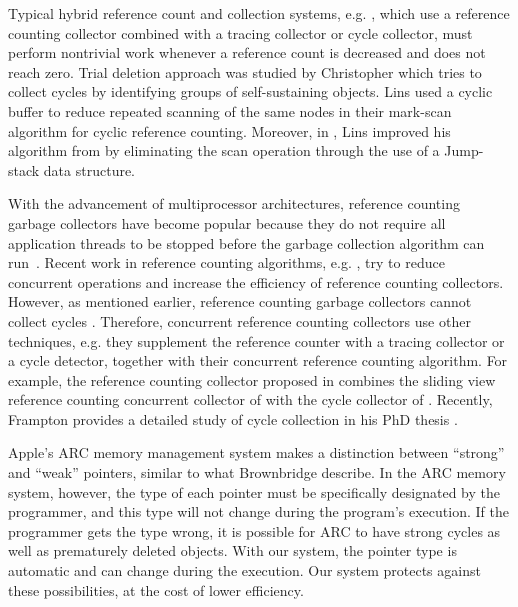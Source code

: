 Typical hybrid reference count and collection systems, e.g. \cite{Bacon2001,Levanoni2006,Bacon:2001:JWC,Barabash2005,Lins2008}, which use a reference counting collector combined with a tracing collector or cycle collector,
must perform nontrivial work whenever a reference count is decreased and does
not reach zero. Trial deletion approach was studied by Christopher \cite{Christopher1984} which tries to collect cycles by identifying groups of self-sustaining objects. 
Lins \cite{Lins:1992:CRC} used a cyclic buffer to reduce repeated scanning of the same nodes in their mark-scan algorithm for cyclic reference counting. Moreover, in \cite{Lins:2002:EAC}, Lins improved his algorithm  from \cite{Lins:1992:CRC} by eliminating the scan operation through the use of a Jump-stack data structure.

With the advancement of multiprocessor architectures,
reference counting garbage collectors have become popular because
they do not require all application threads to be stopped before the garbage collection algorithm can run~\cite{Levanoni2006}.
Recent work in reference counting algorithms, e.g. \cite{Barabash2005,Levanoni2006,Bacon2001,Bacon:2001:JWC}, try to
reduce concurrent operations and increase the efficiency of reference counting collectors.
However, as mentioned earlier, reference counting garbage collectors cannot collect cycles \cite{McBeth1963}. Therefore, concurrent reference counting collectors \cite{Barabash2005,Levanoni2006,Bacon2001,Bacon:2001:JWC,Paz2007,Lins2008} use other techniques, e.g. they supplement the reference counter with a tracing collector or a cycle detector, together with their concurrent reference counting algorithm. For example, the reference counting collector proposed in \cite{Paz2007} combines the sliding view reference counting concurrent collector of \cite{Levanoni2006} with the cycle collector of \cite{Bacon2001}. Recently, Frampton provides a detailed study of cycle collection in his PhD thesis \cite{Frampton2010}.


Apple's ARC memory management system makes a distinction between ``strong'' and ``weak'' pointers, similar to what Brownbridge describe. In the ARC memory system, however, the type of each pointer must be specifically designated by the programmer, and this type will not change during the program's execution. If the programmer gets the type wrong, it is possible for ARC to have strong cycles as well as prematurely deleted objects. With our system, the pointer type is automatic and can change during the execution. Our system protects against these possibilities, at the cost of lower efficiency.

